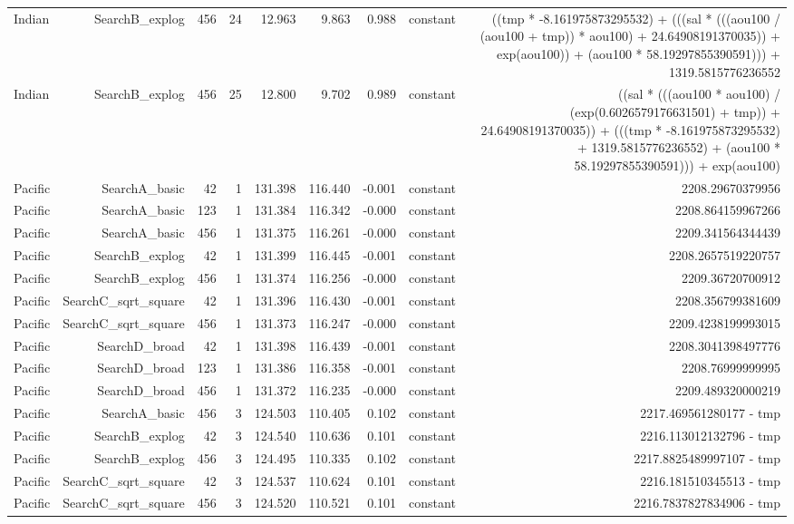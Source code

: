 \begin{table}
{\begin{tabular}{lrrrrrrrr}
Indian & SearchB\_explog & 456 & 24 & 12.963 & 9.863 & 0.988 & constant & ((tmp * -8.161975873295532) + (((sal * (((aou100 / (aou100 + tmp)) * aou100) + 24.64908191370035)) + exp(aou100)) + (aou100 * 58.19297855390591))) + 1319.5815776236552 \\
Indian & SearchB\_explog & 456 & 25 & 12.800 & 9.702 & 0.989 & constant & ((sal * (((aou100 * aou100) / (exp(0.6026579176631501) + tmp)) + 24.64908191370035)) + (((tmp * -8.161975873295532) + 1319.5815776236552) + (aou100 * 58.19297855390591))) + exp(aou100) \\
Pacific & SearchA\_basic & 42 & 1 & 131.398 & 116.440 & -0.001 & constant & 2208.29670379956 \\
Pacific & SearchA\_basic & 123 & 1 & 131.384 & 116.342 & -0.000 & constant & 2208.864159967266 \\
Pacific & SearchA\_basic & 456 & 1 & 131.375 & 116.261 & -0.000 & constant & 2209.341564344439 \\
Pacific & SearchB\_explog & 42 & 1 & 131.399 & 116.445 & -0.001 & constant & 2208.2657519220757 \\
Pacific & SearchB\_explog & 456 & 1 & 131.374 & 116.256 & -0.000 & constant & 2209.36720700912 \\
Pacific & SearchC\_sqrt\_square & 42 & 1 & 131.396 & 116.430 & -0.001 & constant & 2208.356799381609 \\
Pacific & SearchC\_sqrt\_square & 456 & 1 & 131.373 & 116.247 & -0.000 & constant & 2209.4238199993015 \\
Pacific & SearchD\_broad & 42 & 1 & 131.398 & 116.439 & -0.001 & constant & 2208.3041398497776 \\
Pacific & SearchD\_broad & 123 & 1 & 131.386 & 116.358 & -0.001 & constant & 2208.76999999995 \\
Pacific & SearchD\_broad & 456 & 1 & 131.372 & 116.235 & -0.000 & constant & 2209.489320000219 \\
Pacific & SearchA\_basic & 456 & 3 & 124.503 & 110.405 & 0.102 & constant & 2217.469561280177 - tmp \\
Pacific & SearchB\_explog & 42 & 3 & 124.540 & 110.636 & 0.101 & constant & 2216.113012132796 - tmp \\
Pacific & SearchB\_explog & 456 & 3 & 124.495 & 110.335 & 0.102 & constant & 2217.8825489997107 - tmp \\
Pacific & SearchC\_sqrt\_square & 42 & 3 & 124.537 & 110.624 & 0.101 & constant & 2216.181510345513 - tmp \\
Pacific & SearchC\_sqrt\_square & 456 & 3 & 124.520 & 110.521 & 0.101 & constant & 2216.7837827834906 - tmp \\

\end{tabular}}
\end{table}
